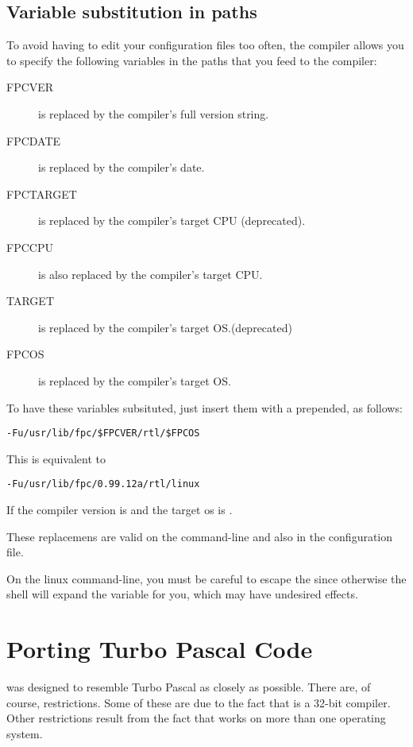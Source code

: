 \documentclass{book}
\begin{document}
\section{Variable substitution in paths}
To avoid having to edit your configuration files too often,
the compiler allows you to specify the following variables in
the paths that you feed to the compiler:
\begin{description}
\item[FPCVER] is replaced by the compiler's full version string.
\item[FPCDATE] is replaced by the compiler's date.
\item[FPCTARGET] is replaced by the compiler's target CPU
(deprecated).
\item[FPCCPU] is also replaced by the compiler's target CPU.
\item[TARGET] is replaced by the compiler's target OS.(deprecated)
\item[FPCOS] is replaced by the compiler's target OS.
\end{description}
To have these variables subsituted, just insert them with a \var{\$}
prepended, as follows:
\begin{verbatim}
-Fu/usr/lib/fpc/$FPCVER/rtl/$FPCOS
\end{verbatim}
This is equivalent to
\begin{verbatim}
-Fu/usr/lib/fpc/0.99.12a/rtl/linux
\end{verbatim}
If the compiler version is  and the target os is .

These replacemens are valid on the command-line and also in the
configuration file.

On the linux command-line, you must be careful to escape the \var{\$} since
otherwise the shell will expand the variable for you, which may have
undesired effects.


\chapter{Porting Turbo Pascal Code}

\fpc was designed to resemble Turbo Pascal as closely as possible. There
are, of course, restrictions. Some of these are due to the fact that \fpc is
a 32-bit compiler. Other restrictions result from the fact that \fpc works
on more than one operating system.
\end{document}
